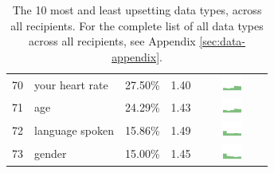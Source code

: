 \begin{table}[t]
\begin{center}
\begin{tabular}{| r | l | r | r |c |}
70 & your heart rate & 27.50\% & 1.40 & \includegraphics[width = 2cm, height = 0.5cm]{tex-inputs/data10/learnedyourheartratecombined} \\
71 & age & 24.29\% & 1.43 & \includegraphics[width = 2cm, height = 0.5cm]{tex-inputs/data10/learnedyouragecombined}\\
72 & language spoken & 15.86\% & 1.49 & \includegraphics[width = 2cm, height = 0.5cm]{tex-inputs/data10/learnedthelanguageyouwerespeakingcombined}\\
73 & gender & 15.00\% & 1.45 & \includegraphics[width = 2cm, height = 0.5cm]{tex-inputs/data10/learnedyourgendercombined}\\ 
\hline
\end{tabular}
\caption{The 10 most and least upsetting data types, across all recipients. For the complete list of all data types across all recipients, see Appendix \ref{sec:data-appendix}.}
\label{top10-table}
\end{center}
\end{table}











